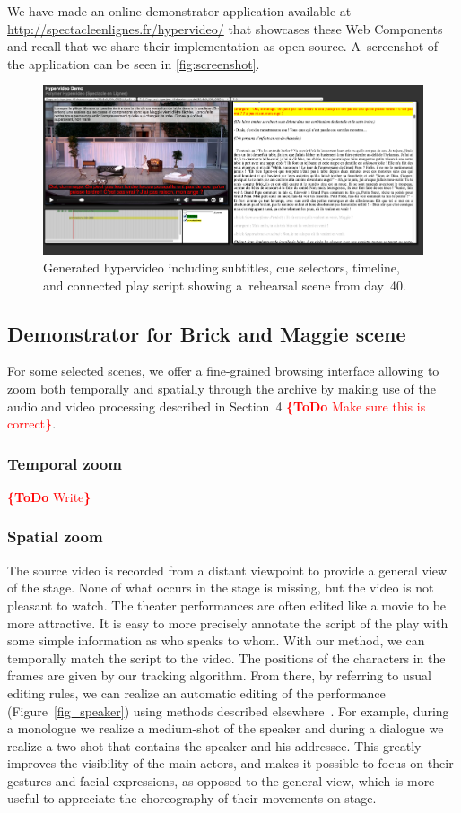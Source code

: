 \documentclass[conference]{IEEEtran}
\newcommand{\todo}[1]{\noindent\textcolor{red}{{\bf \{ToDo} #1{\bf \}}}}
\begin{document}
\noindent We have made an online demonstrator application available at
\url{http://spectacleenlignes.fr/hypervideo/} that showcases these Web Components
and recall that we share their implementation as open source.
A~screenshot of the application can be seen in \autoref{fig:screenshot}.

\begin{figure}[htb!]
  \centering
  \includegraphics[width=0.95\linewidth]{screenshot}
  \caption{Generated hypervideo including subtitles, cue selectors, timeline, and connected play script
    showing a~rehearsal scene from day~40.}
  \label{fig:screenshot}
\end{figure}

\subsection{Demonstrator for Brick and Maggie scene}
For some selected scenes, we offer a fine-grained browsing interface allowing to zoom both temporally and spatially
through the archive by making use of the audio and video processing described in Section~4 \todo{Make sure this is correct}.  

\subsubsection{Temporal zoom} \todo{Write}

\subsubsection{Spatial zoom}
The source video  is recorded from a distant viewpoint  to provide  a general  view of the stage.  None of what occurs in the stage is missing, but the video is not pleasant to watch.  The theater performances are often edited like a movie to be more attractive.   It is easy to more precisely annotate the script of the play with some simple information as who speaks to whom. With our method, we can temporally match the script to the video.  The positions of the characters in the frames are given by our tracking algorithm.  From there, by referring to usual editing rules, we can realize an automatic editing of the performance (Figure~\ref{fig_speaker}) using methods described elsewhere~\cite{Gandhi14}.  For example, during a monologue we realize a medium-shot of the speaker and during a dialogue we realize a two-shot that contains the speaker and his addressee. This greatly improves the visibility of the main actors, and makes it possible to focus on their gestures and facial expressions, as opposed to the general view, which is more useful to appreciate the choreography of their movements on stage.
\end{document}
